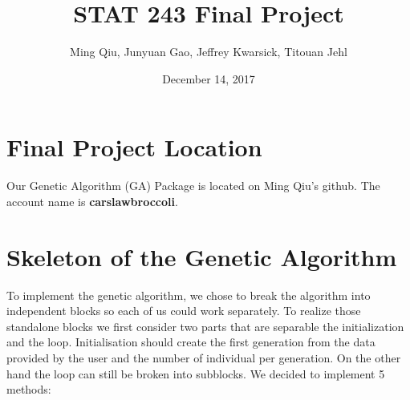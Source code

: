 \documentclass{article}\usepackage[]{graphicx}\usepackage[]{color}
\begin{document}
\title{STAT 243 Final Project}
\author{Ming Qiu, Junyuan Gao, Jeffrey Kwarsick, Titouan Jehl}
\date{December 14, 2017}
\maketitle

\section{Final Project Location}
Our Genetic Algorithm (GA) Package is located on Ming Qiu’s github. The account name is
\textbf{carslawbroccoli}.

\section{Skeleton of the Genetic Algorithm}
To implement the genetic algorithm, we chose to break the algorithm into independent blocks so
each of us could work separately. To realize those standalone blocks we first consider two parts
that are separable the initialization and the loop. Initialisation should create the first generation
from the data provided by the user and the number of individual per generation. On the other
hand the loop can still be broken into subblocks. We decided to implement 5 methods:
\end{document}
